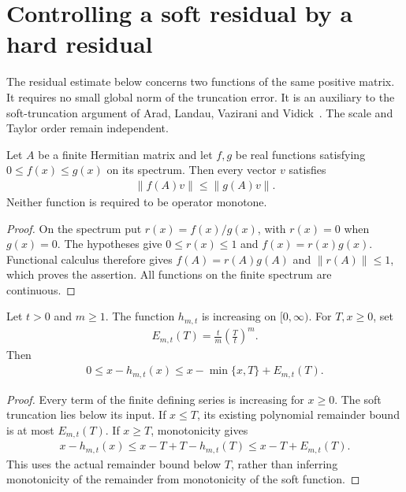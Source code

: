 \section{Controlling a soft residual by a hard residual}
\label{sec:soft_hard_residual}

The residual estimate below concerns two functions of the same positive
matrix. It requires no small global norm of the truncation error. It is
an auxiliary to the soft-truncation argument of Arad, Landau, Vazirani
and Vidick~\cite[lines 1178--1185 and 1195--1255]{Arad2016RigorousRG}.
The scale and Taylor order remain independent.

\begin{lemma}
    \label{lem:positive_cfc_vector_norm_domination}
    \leanok
    Let $A$ be a finite Hermitian matrix and let $f,g$ be real functions
    satisfying $0\leq f(x)\leq g(x)$ on its spectrum. Then every vector
    $v$ satisfies
    \begin{align}
        \|f(A)v\|\leq\|g(A)v\|.
    \end{align}
    Neither function is required to be operator monotone.
\end{lemma}
\begin{proof}\leanok
    On the spectrum put $r(x)=f(x)/g(x)$, with $r(x)=0$ when $g(x)=0$.
    The hypotheses give $0\leq r(x)\leq1$ and $f(x)=r(x)g(x)$.
    Functional calculus therefore gives $f(A)=r(A)g(A)$ and
    $\|r(A)\|\leq1$, which proves the assertion. All functions on the
    finite spectrum are continuous.
\end{proof}

\begin{lemma}
    \label{lem:soft_hard_scalar_residual}
    \leanok
    Let $t>0$ and $m\geq1$. The function $h_{m,t}$ is increasing on
    $[0,\infty)$. For $T,x\geq0$, set
    \begin{align}
        E_{m,t}(T)=\frac{t}{m}\left(\frac{T}{t}\right)^m.
    \end{align}
    Then
    \begin{align}
        0\leq x-h_{m,t}(x)
        \leq x-\min\{x,T\}+E_{m,t}(T).
    \end{align}
\end{lemma}
\begin{proof}\leanok
    Every term of the finite defining series is increasing for $x\geq0$.
    The soft truncation lies below its input. If $x\leq T$, its existing
    polynomial remainder bound is at most $E_{m,t}(T)$. If $x\geq T$,
    monotonicity gives
    \begin{align}
        x-h_{m,t}(x)\leq x-T+T-h_{m,t}(T)
        \leq x-T+E_{m,t}(T).
    \end{align}
    This uses the actual remainder bound below $T$, rather than inferring
    monotonicity of the remainder from monotonicity of the soft function.
\end{proof}


